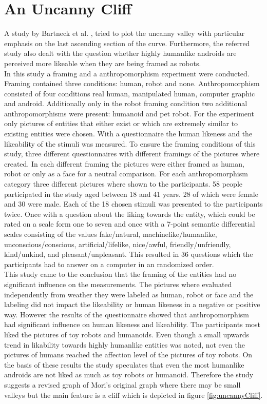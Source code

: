 \section{An Uncanny Cliff}
A study by Bartneck et al. \cite{uncanny_cliff}, tried to plot the uncanny valley with particular emphasis on the last ascending section of the curve. Furthermore, the referred study also dealt with the question whether highly humanlike androids are perceived more likeable when they are being framed as robots.\\
In this study a framing and a anthropomorphism experiment were conducted. Framing contained three conditions: human, robot and none. Anthropomorphism consisted of four conditions real human, manipulated human, computer graphic and android. Additionally only in the robot framing condition two additional anthropomorphisms were present: humanoid and pet robot. For the experiment only pictures of entities that either exist or which are extremely similar to existing entities were chosen. 
With a questionnaire the human likeness and the likeability of the stimuli was measured.
To ensure the framing conditions of this study, three different questionnaires with different framings of the pictures where created. In each different framing the pictures were either framed as human, robot or only as a face for a neutral comparison. For each anthropomorphism category three different pictures where shown to the participants. 
58 people participated in the study aged between 18 and 41 years. 28 of which were female and 30 were male.
Each of the 18 chosen stimuli was presented to the participants twice. Once with a question about the liking towards the entity, which could be rated on a scale form one to seven and once with a 7-point semantic differential scales consisting of the values fake/natural, machinelike/humanlike, unconscious/conscious, artificial/lifelike, nice/awful, friendly/unfriendly, kind/unkind, and pleasant/unpleasant. This resulted in 36 questions which the participants had to answer on a computer in an randomized order.\\
This study came to the conclusion that the framing of the entities had no significant influence on the measurements. The pictures where evaluated independently from weather they were labeled as human, robot or face and the labeling did not impact the likeability or human likeness in a negative or positive way.
However the results of the questionnaire showed that anthropomorphism had significant influence on human likeness and likeability. The participants most liked the pictures of toy robots and humanoids. Even though a small upwards trend in likability towards highly humanlike entities was noted, not even the pictures of humans reached the affection level of the pictures of toy robots. On the basis of these results the study speculates that even the most humanlike androids are not liked as much as toy robots or humanoid. Therefore the study suggests a revised graph of Mori's original graph where there may be small valleys but the main feature is a cliff which is depicted in figure \ref{fig:uncannyCliff}.
